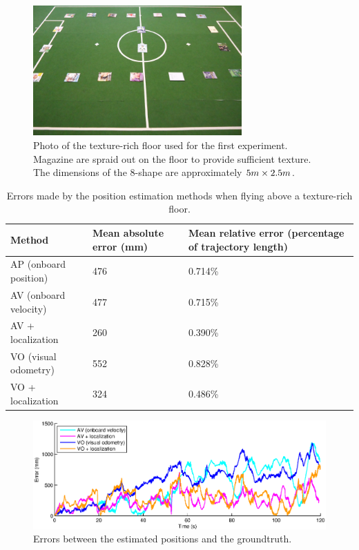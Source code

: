 \begin{figure}[htb!]
\centering
\includegraphics[width=8cm]{images/exp1-floor.jpg}
\caption{Photo of the texture-rich floor used for the first experiment. Magazine are spraid out on the floor to provide sufficient texture. The dimensions of the 8-shape are approximately $5\small{m} \times 2.5\small{m}$.}
\label{fig:exp1-floor}
\end{figure}

\begin{table}[htb!]
    \centering
    \begin{tabular}
        { | l | l | l | } 
	\hline
	Method & Mean absolute error (\small{mm}) & Mean relative error (percentage of trajectory length) \\
        \hline
	AP (onboard position) & 476 & 0.714\% \\
        AV (onboard velocity) & 477 & 0.715\% \\
	AV + localization & 260 & 0.390\% \\
	VO (visual odometry) & 552 & 0.828\% \\
	VO + localization & 324 & 0.486\% \\
	\hline
    \end{tabular}
    \caption{Errors made by the position estimation methods when flying above a texture-rich floor.}
    \label{tab:res_mapping}
\end{table}

\begin{figure}[htb!]
\centering
\includegraphics[width=\linewidth]{images/exp1-run13-error.eps}
\caption{Errors between the estimated positions and the groundtruth.}
\label{fig:exp1-texture-error}
\end{figure}

